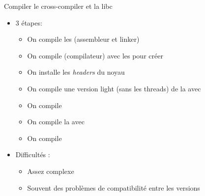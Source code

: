\begin{frame}[fragile=singleslide]{Compiler le cross-compiler et la libc}
  \begin{itemize}
  \item 3 étapes:
    \begin{itemize}
    \item On compile les  (assembleur et linker)
    \item On compile  (compilateur) avec les 
      pour créer 
    \item On installe les \emph{headers} du noyau
    \item On compile une version light (sans les threads) de la  avec
    \item On compile 
    \item On compile la  avec 
    \item On compile 
    \end{itemize}
  \item Difficultés :
    \begin{itemize}
    \item Assez complexe
    \item Souvent des problèmes de compatibilité entre les versions
    \end{itemize}
  \end{itemize}
\end{frame}

